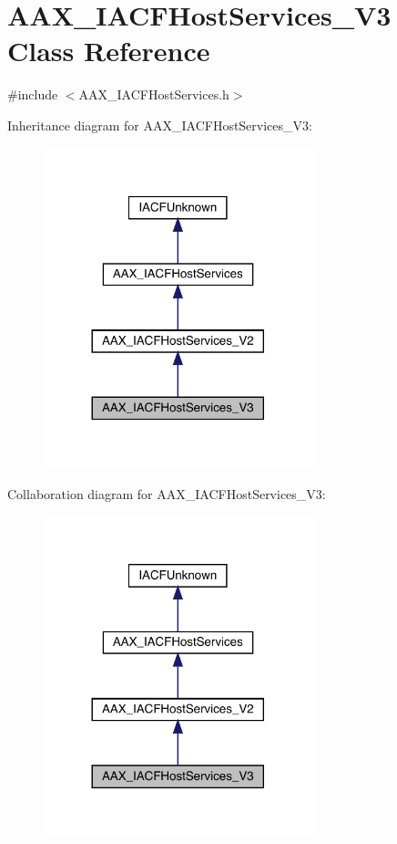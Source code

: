 \hypertarget{a01721}{}\section{A\+A\+X\+\_\+\+I\+A\+C\+F\+Host\+Services\+\_\+\+V3 Class Reference}
\label{a01721}


{\ttfamily \#include $<$A\+A\+X\+\_\+\+I\+A\+C\+F\+Host\+Services.\+h$>$}



Inheritance diagram for A\+A\+X\+\_\+\+I\+A\+C\+F\+Host\+Services\+\_\+\+V3\+:
\nopagebreak
\begin{figure}[H]
\begin{center}
\leavevmode
\includegraphics[width=221pt]{a01720}
\end{center}
\end{figure}


Collaboration diagram for A\+A\+X\+\_\+\+I\+A\+C\+F\+Host\+Services\+\_\+\+V3\+:
\nopagebreak
\begin{figure}[H]
\begin{center}
\leavevmode
\includegraphics[width=221pt]{a01719}
\end{center}
\end{figure}


